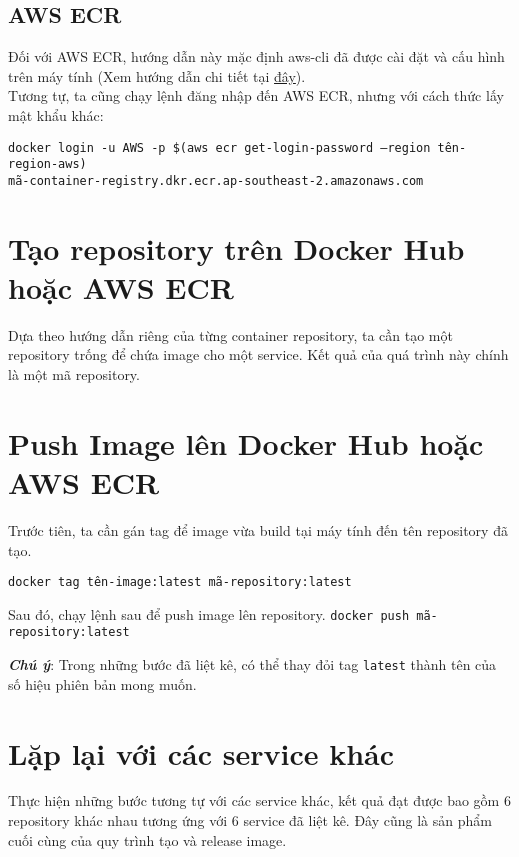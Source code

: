 \subsection{AWS ECR}
Đối với AWS ECR, hướng dẫn này mặc định aws-cli đã được cài đặt và cấu hình trên máy tính (Xem hướng dẫn chi tiết tại \href{https://docs.aws.amazon.com/cli/latest/userguide/getting-started-install.html}{đây}). \\
Tương tự, ta cũng chạy lệnh đăng nhập đến AWS ECR, nhưng với cách thức lấy mật khẩu khác:

\texttt{docker login -u AWS -p \$(aws ecr get-login-password --region tên-region-aws) \\ mã-container-registry.dkr.ecr.ap-southeast-2.amazonaws.com}

\section{Tạo repository trên Docker Hub hoặc AWS ECR}
Dựa theo hướng dẫn riêng của từng container repository, ta cần tạo một repository trống để chứa image cho một service. Kết quả của quá trình này chính là một mã repository.

\section{Push Image lên Docker Hub hoặc AWS ECR}
Trước tiên, ta cần gán tag để image vừa build tại máy tính đến tên repository đã tạo.

\texttt{docker tag tên-image:latest mã-repository:latest}

Sau đó, chạy lệnh sau để push image lên repository.
\texttt{docker push mã-repository:latest}

\textbf{\textit{Chú ý}}: Trong những bước đã liệt kê, có thể thay đỏi tag \texttt{latest} thành tên của số hiệu phiên bản mong muốn.


\section{Lặp lại với các service khác}
Thực hiện những bước tương tự với các service khác, kết quả đạt được bao gồm $6$ repository khác nhau tương ứng với $6$ service đã liệt kê. Đây cũng là sản phẩm cuối cùng của quy trình tạo và release image.
